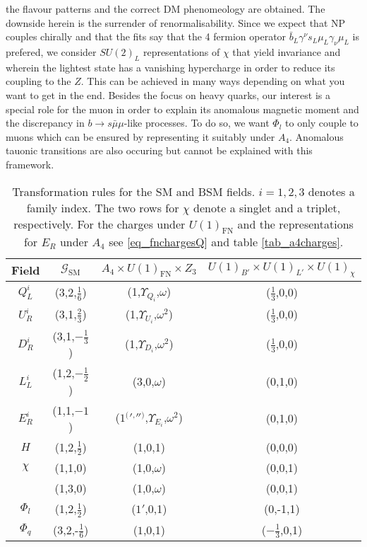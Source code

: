 the flavour patterns and the correct DM phenomeology are obtained. 
The downside herein is the surrender of renormalisability. Since we expect that NP couples chirally and that the fits say that the 4 fermion operator 
$\bar b_L \gamma^\nu s_L \mu_L \gamma_\nu \mu_L$ is prefered, we consider $SU(2)_L$ representations of $\chi$ that yield invariance and wherein the lightest
state has a vanishing hypercharge in order to reduce its coupling to the $Z$. This can be achieved in many ways depending on what you want to get 
in the end. Besides the focus on heavy quarks,
our interest is a special role for the muon in order to explain its anomalous magnetic moment and the discrepancy in  
$b\rightarrow s\bar\mu\mu$-like processes. 
To do so, we want $\Phi_l$ to only couple to muons which can be ensured by representing it suitably under $A_4$. Anomalous tauonic transitions are 
also occuring but cannot be explained with this framework.
\begin{table}[t]
 \begin{tabular}{c|c|c|c}
  Field & $\mathcal{G}_\text{SM}$ & $A_4 \times U(1)_\text{FN} \times Z_3$ & $U(1)_{B'}\times U(1)_{L'}\times U(1)_\chi$\\
  \hline
  $Q^i_L$ & (3,2,$\frac16$) & (1,$\Upsilon_{Q_i}$,$\omega$) & ($\frac13$,0,0)\\
  $U^i_R$ & (3,1,$\frac23$) & (1,$\Upsilon_{U_i}$,$\omega^2$)& ($\frac13$,0,0)\\
  $D^i_R$ & (3,1,$-\frac13$) & (1,$\Upsilon_{D_i}$,$\omega^2$)& ($\frac13$,0,0)\\
  $L^i_L$ & (1,2,$-\frac12$) & (3,0,$\omega$)& (0,1,0)\\
  $E^i_R$ & (1,1,$-1$) & ($1 {^(} {'} {^,} '' {^)} $,$\Upsilon_{E_i}$,$\omega^2$)& (0,1,0)\\
  $H$ & (1,2,$\frac12$) & (1,0,1)& (0,0,0)\\
  \hline
  $\chi$ & (1,1,0) & (1,0,$\omega$)& (0,0,1)\\ %
 & (1,3,0) & (1,0,$\omega$)&(0,0,1)\\
  $\Phi_l$ & (1,2,$\frac12$) & ($1'$,0,1)& (0,-1,1)\\
  $\Phi_q$ & (3,2,-$\frac16$) & ($1$,0,1)& ($-\frac13$,0,1)\\
 \end{tabular}
\caption{Transformation rules for the SM and BSM fields. $i=1,2,3$ denotes a family index. The two rows for $\chi$ denote a singlet and a triplet, respectively. For the charges under 
$U(1)_\text{FN}$ and the representations for $E_R$ under $A_4$ see \eqref{eq_fnchargesQ} and table \ref{tab_a4charges}.}
\label{tab_models}
\end{table}
